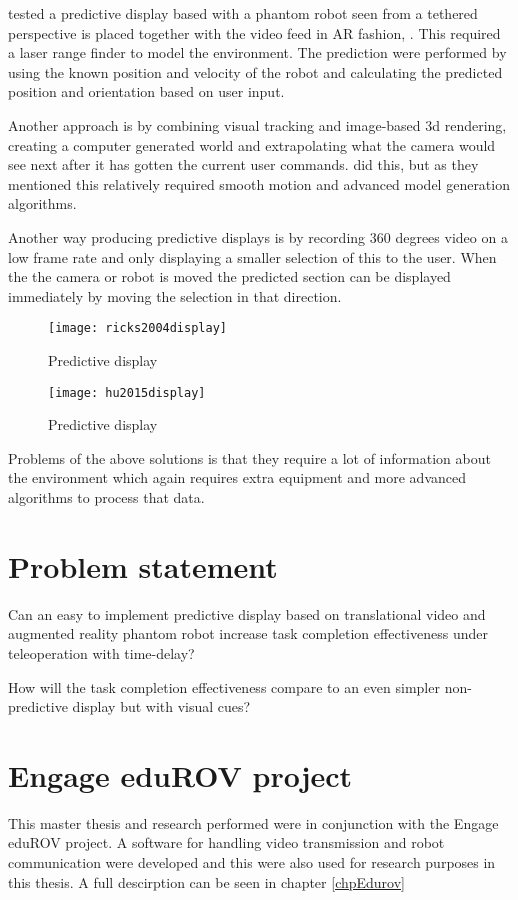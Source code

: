\citep{Ricks2004} tested a predictive display based with a phantom robot seen from a tethered perspective is placed together with the video feed in AR fashion, . This required a laser range finder to model the environment. The prediction were performed by using the known position and velocity of the robot and calculating the predicted position and orientation based on user input.

Another approach is by combining visual tracking and image-based 3d rendering, creating a computer generated world and extrapolating what the camera would see next after it has gotten the current user commands. \citep{Hu2015} did this, but as they mentioned this relatively required smooth motion and advanced model generation algorithms.

Another way producing predictive displays is by recording 360 degrees video on a low frame rate and only displaying a smaller selection of this to the user. When the the camera or robot is moved the predicted section can be displayed immediately by moving the selection in that direction. \citep{Baldwin1999}

\begin{figure}[h!]
    \centering
    \texttt{[image: ricks2004display]}
    \caption{Predictive display \citep{Ricks2004}}
    \label{figRicks2004}
\end{figure}

\begin{figure}[h!]
    \centering
    \texttt{[image: hu2015display]}
    \caption{Predictive display \citep{Hu2015}}
\end{figure}

Problems of the above solutions is that they require a lot of information about the environment which again requires extra equipment and more advanced algorithms to process that data.

\section{Problem statement}

Can an easy to implement predictive display based on translational video and augmented reality phantom robot increase task completion effectiveness under teleoperation with time-delay?

How will the task completion effectiveness compare to an even simpler non-predictive display but with visual cues?

\section{Engage eduROV project}

This master thesis and research performed were in conjunction with the Engage eduROV project. A software for handling video transmission and robot communication were developed and this were also used for research purposes in this thesis. A full descirption can be seen in chapter \ref{chpEdurov}